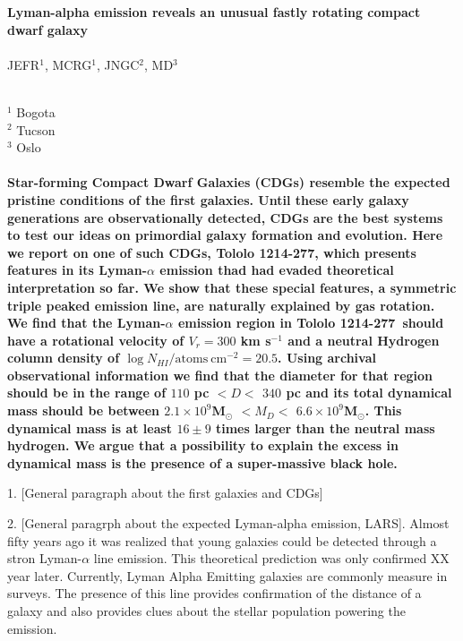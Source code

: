 \documentclass[a4paper, usenatbib, 12pt]{article}
\newcommand{\tol}{Tololo 1214-277}
\begin{document}
\pagestyle{empty}
\noindent
\textbf{Lyman-alpha emission reveals an unusual fastly rotating
  compact dwarf galaxy}  
\\
\\
JEFR$^{1}$, MCRG$^1$, JNGC$^2$, MD$^3$
\\
\\
\scriptsize
{$^1$ Bogota
\\
$^2$ Tucson
\\
$^3$ Oslo
\normalsize
\\
\\
\textbf{
Star-forming Compact Dwarf Galaxies (CDGs) resemble the expected pristine
conditions of the first galaxies.  
Until these early galaxy generations are observationally
detected, CDGs are the best systems to test our ideas on primordial
galaxy formation and evolution.  
Here we report on one of such CDGs, \tol, which presents
features in its Lyman-$\alpha$ emission thad had evaded theoretical
interpretation so far. 
We show that these special features, a symmetric triple peaked
emission line, are naturally explained by gas rotation.  
We find that the Lyman-$\alpha$ emission region in \tol\ should
have a rotational velocity of $V_{r}=300$ km s$^{-1}$ and a neutral
Hydrogen column density of $\log N_{HI} / \mathrm{atoms\ cm}^{-2} =
  20.5$.   
Using archival observational information we find that
the diameter for that region should be in the range of
$110$ pc $<D<$ $340$ pc and its total dynamical mass 
should be between $2.1\times 10^{9}$M$_{\odot}$ $<M_D<$  $6.6\times
10^{9}$M$_{\odot}$. 
This dynamical mass is at least $16\pm 9$ times
larger than the neutral mass hydrogen.
We argue that a possibility to explain the excess in
dynamical mass is the presence of a super-massive black hole. }




1. [General paragraph about the first galaxies and CDGs]


2. [General paragrph about the expected Lyman-alpha emission,
  LARS]. Almost fifty years ago \cite{PartridgePeebles} it was
realized that young galaxies could be detected through a stron
Lyman-$\alpha$ line emission.  This theoretical prediction was only
confirmed XX year later. 
Currently, Lyman Alpha Emitting galaxies are commonly measure in
surveys. 
The presence of this line provides confirmation of the distance of a
galaxy and also provides clues about the stellar population powering
the emission.

}
\end{document}
